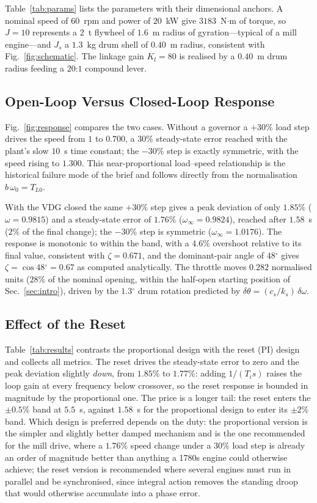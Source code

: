 \documentclass[conference]{IEEEtran}
\newcommand{\dg}{\ensuremath{^{\circ}}}
\begin{document}
Table~\ref{tab:params} lists the parameters with their dimensional anchors. A
nominal speed of $60$~rpm and power of $20$~kW give $3183$~N$\cdot$m of torque, so
$J=10$ represents a $2$~t flywheel of $1.6$~m radius of gyration---typical of a mill
engine---and $J_s$ a $1.3$~kg drum shell of $0.40$~m radius, consistent with
Fig.~\ref{fig:schematic}. The linkage gain $K_l=80$ is realised by a $0.40$~m drum
radius feeding a $20$:$1$ compound lever.

\subsection{Open-Loop Versus Closed-Loop Response}
Fig.~\ref{fig:response} compares the two cases. Without a governor a $+30\%$ load
step drives the speed from $1$ to $0.700$, a \emph{$30\%$} steady-state error
reached with the plant's slow $10$~s time constant; the $-30\%$ step is exactly
symmetric, with the speed rising to $1.300$. This near-proportional load--speed
relationship is the historical failure mode of the brief and follows directly from
the normalisation $b\,\omega_0=T_{L0}$.

With the VDG closed the same $+30\%$ step gives a peak deviation of only $1.85\%$
($\omega=0.9815$) and a steady-state error of $1.76\%$ ($\omega_\infty=0.9824$),
reached after $1.58$~s ($2\%$ of the final change); the $-30\%$ step is symmetric
($\omega_\infty=1.0176$). The response is monotonic to within the band, with a
$4.6\%$ overshoot relative to its final value, consistent with $\zeta=0.671$, and the
dominant-pair angle of $48\dg$ gives $\zeta=\cos48\dg=0.67$ as computed
analytically. The throttle moves $0.282$ normalised units ($28\%$ of the nominal
opening, within the half-open starting position of Sec.~\ref{sec:intro}), driven by
the $1.3\dg$ drum rotation predicted by $\delta\theta=(c_s/k_s)\,\delta\omega$.

\subsection{Effect of the Reset}
Table~\ref{tab:results} contrasts the proportional design with the reset (PI) design
and collects all metrics. The reset drives the steady-state
error to zero and the peak deviation slightly \emph{down}, from $1.85\%$ to
$1.77\%$: adding $1/(T_is)$ raises the loop gain at every frequency below
crossover, so the reset response is bounded in magnitude by the proportional one.
The price is a longer tail: the reset enters the $\pm0.5\%$ band at $5.5$~s, against
$1.58$~s for the proportional design to enter its $\pm2\%$ band. Which
design is preferred depends on the duty: the
proportional version is the simpler and slightly better damped mechanism and is the
one recommended for the mill drive, where a $1.76\%$ speed change under a $30\%$
load step is already an order of magnitude better than anything a
1780s engine could otherwise achieve; the reset version is recommended where
several engines must run in parallel and be synchronised, since integral action
removes the standing droop that would otherwise accumulate into a phase error.
\end{document}
